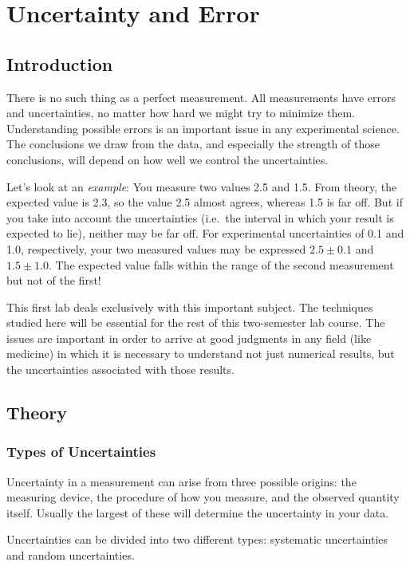 \documentclass{article}
\begin{document}
\chapter{Uncertainty and Error}

\section{Introduction}

There is no such thing as a perfect measurement. All measurements have errors and uncertainties, no matter how hard we might try to minimize them. Understanding possible errors is an important issue in any experimental science. The conclusions we draw from the data, and especially the strength of those conclusions, will depend on how well we control the uncertainties. \myskip

Let’s look at an \emph{example}: You measure two values 2.5 and 1.5. From theory, the expected value is 2.3, so the value 2.5 almost agrees, whereas 1.5 is far off. But if you take into account the uncertainties (i.e.\ the interval in which your result is expected to lie), neither may be far off. For experimental uncertainties of 0.1 and 1.0, respectively, your two measured values may be expressed $2.5\pm 0.1$ and $1.5\pm 1.0$. The expected value falls within the range of the second measurement but not of the first! \myskip

This first lab deals exclusively with this important subject. The techniques studied here will be essential for the rest of this two-semester lab course. The issues are important in order to arrive at good judgments in any field (like medicine) in which it is necessary to understand not just numerical results, but the uncertainties associated with those results.

\section{Theory}

\subsection{Types of Uncertainties}

Uncertainty in a measurement can arise from three possible origins: the measuring device, the procedure of how you measure, and the observed quantity itself. Usually the largest of these will determine the uncertainty in your data. \myskip

Uncertainties can be divided into two different types: systematic uncertainties and random uncertainties. 
\end{document}
